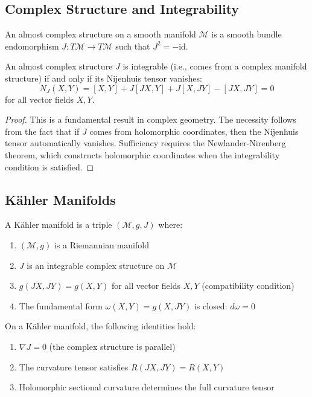 \subsection{Complex Structure and Integrability}

\begin{definition}
\label{def:almost_complex}
An almost complex structure on a smooth manifold $\mathcal{M}$ is a smooth bundle endomorphism $J: T\mathcal{M} \to T\mathcal{M}$ such that $J^2 = -\text{id}$.
\end{definition}

\begin{theorem}
\label{thm:newlander_nirenberg}
An almost complex structure $J$ is integrable (i.e., comes from a complex manifold structure) if and only if its Nijenhuis tensor vanishes:
$$N_J(X,Y) = [X,Y] + J[JX,Y] + J[X,JY] - [JX,JY] = 0$$
for all vector fields $X, Y$.
\end{theorem}

\begin{proof}
This is a fundamental result in complex geometry. The necessity follows from the fact that if $J$ comes from holomorphic coordinates, then the Nijenhuis tensor automatically vanishes. Sufficiency requires the Newlander-Nirenberg theorem, which constructs holomorphic coordinates when the integrability condition is satisfied.
\end{proof}

\subsection{Kähler Manifolds}

\begin{definition}
\label{def:kahler_manifold}
A Kähler manifold is a triple $(\mathcal{M}, g, J)$ where:
\begin{enumerate}
\item $(\mathcal{M}, g)$ is a Riemannian manifold
\item $J$ is an integrable complex structure on $\mathcal{M}$
\item $g(JX, JY) = g(X, Y)$ for all vector fields $X, Y$ (compatibility condition)
\item The fundamental form $\omega(X, Y) = g(X, JY)$ is closed: $d\omega = 0$
\end{enumerate}
\end{definition}

\begin{theorem}
\label{thm:kahler_identities}
On a Kähler manifold, the following identities hold:
\begin{enumerate}
\item $\nabla J = 0$ (the complex structure is parallel)
\item The curvature tensor satisfies $R(JX, JY) = R(X, Y)$
\item Holomorphic sectional curvature determines the full curvature tensor
\end{enumerate}
\end{theorem}

